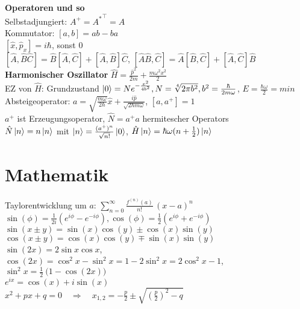 \documentclass[a4paper, 11pt, fleqn]{article}
\begin{document}
\begin{multicols}{2}
\textbf{Operatoren und so}\\
Selbstadjungiert: $A^+ = {A^\ast}^\top = A$\\
Kommutator: $[a, b] = ab - ba$\\
$[\hat{x}, \hat{p}_x] = i \hbar$, sonst $0$\\
$[\hat{A}, \hat{B} \hat{C}] = \hat{B}[\hat{A}, \hat{C}] + [\hat{A}, \hat{B}] \hat{C}$, $[\hat{A} \hat{B}, \hat{C}] = \hat{A} [\hat{B}, \hat{C}] + [\hat{A}, \hat{C}] \hat{B}$\\
\textbf{Harmonischer Oszillator} $\hat{H} = \frac{\hat{p}^2}{2m} + \frac{m \omega^2 x^2}{2}$\\
EZ von $\hat{H}$: Grundzustand $\ket{0} = N e^{-\frac{x^2}{4b^2}}, N = \sqrt[4]{2 \pi b^2}, b^2 = \frac{\hbar}{2 m \omega}$, $E = \frac{\hbar \omega}{2} = min$\\
Absteigeoperator: $a = \sqrt{\frac{m\omega}{2 \hbar}} \hat{x} + \frac{i \hat{p}}{\sqrt{2 \hbar m \omega}}$, $[a, a^+] = 1$\\
$a^+$ ist Erzeugungsoperator, $\hat{N} = a^+ a$ hermitescher Operators\\
$\hat{N} \ket{n} = n \ket{n}$ mit $\ket{n} = \frac{(a^+)^n}{\sqrt{n!}} \ket{0}$, $\hat{H} \ket{n} = \hbar \omega (n + \frac{1}{2}) \ket{n}$

\section{Mathematik}
Taylorentwicklung um $a$: $\sum_{n=0} ^ {\infty} \frac {f^{(n)}(a)}{n!} \, (x-a)^{n}$\\
$\sin(\phi) = \frac1{2i} (e^{i\phi} - e^{-i\phi}), \cos(\phi) = \frac12 (e^{i\phi} + e^{-i\phi})$\\
$\sin(x \pm y)=\sin(x)\cos(y) \pm \cos(x)\sin(y)$\\
$\cos(x \pm y)=\cos(x)\cos(y) \mp \sin(x)\sin(y)$\\
$\sin (2x)= 2 \sin x \cos x$, $\cos (2x)= \cos^2 x - \sin^2 x = 1 - 2 \sin^2 x = 2 \cos^2 x - 1$, $\sin^2 x = \frac{1}{2}\ \Big(1 - \cos (2x) \Big)$\\
$e^{ix} = \cos(x) + i \sin(x)$\\
$x^2+px+q=0 \quad \Rightarrow \quad x_{1,2} = - \frac{p}{2}\pm\sqrt{\left(\frac{p}2\right)^2 - q}$
\end{multicols}
\end{document}
